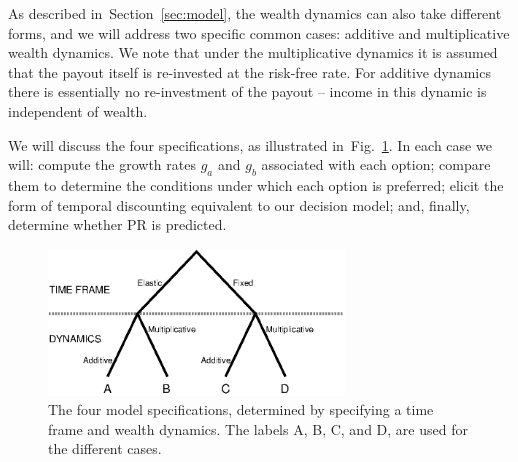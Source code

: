 \documentclass[11pt]{article}
\newcommand{\Sref}[1]{Section~\ref{sec:#1}}
\newcommand{\ie}{{\it i.e.}\ }
\newcommand{\flabel}[1]{\label{fig:#1}}
\newcommand{\fref}[1]{Fig.~\ref{fig:#1}}
\newcommand{\Dt}{\Delta t}
\numberwithin{equation}{section}
\begin{document}




As described in~\Sref{model}, the wealth dynamics can also take different forms, and we will address two specific common cases: additive and multiplicative wealth dynamics. We note that under the multiplicative dynamics it is assumed that the payout itself is re-invested at the risk-free rate. For additive dynamics there is essentially no re-investment of the payout -- income in this dynamic is independent of wealth.

We will discuss the four specifications, as illustrated in~\fref{tree}. In each case we will: compute the growth rates $g_a$ and $g_b$ associated with each option; compare them to determine the conditions under which each option is preferred; elicit the form of temporal discounting equivalent to our decision model; and, finally, determine whether PR is predicted.

\begin{figure}[!htb]
\centering
\includegraphics[width=0.7\textwidth]{./figures/tree.eps}
\caption{The four model specifications, determined by specifying a time frame and wealth dynamics. The labels A, B, C, and D, are used for the different cases.}
\flabel{tree}
\end{figure}
\end{document}

